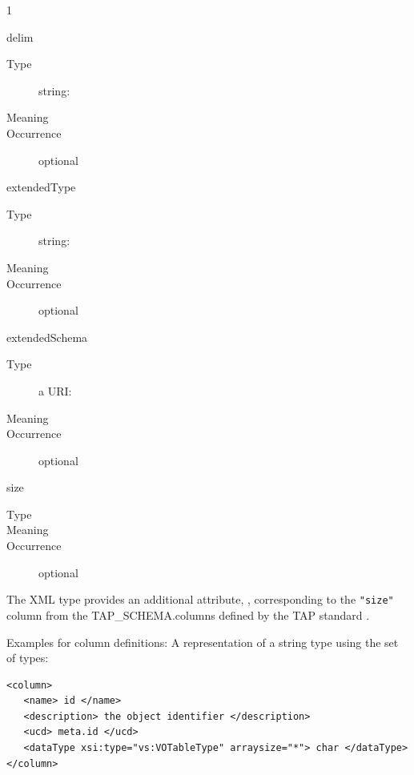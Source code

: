 \documentclass[11pt,a4paper]{ivoa}
\begin{document}
\begin{generated}
\begin{bigdescription}
\begin{description}
1
\end{description}
\item[delim]
\begin{description}
\item[Type] string: 
\item[Meaning] 
\item[Occurrence] optional
 
\end{description}
\item[extendedType]
\begin{description}
\item[Type] string: 
\item[Meaning] 
\item[Occurrence] optional
\end{description}
\item[extendedSchema]
\begin{description}
\item[Type] a URI: 
\item[Meaning] 
\item[Occurrence] optional
\end{description}
\item[size]
\begin{description}
\item[Type] 
\item[Meaning] 
\item[Occurrence] optional
\end{description}


\end{bigdescription}\endgroup

\endgroup
\end{generated}





The  XML type provides an additional attribute,
, corresponding to the \verb|"size"| column from the
TAP\_SCHEMA.columns defined by the TAP standard
\citep{todo:TAP1.1}.




Examples for column definitions:
A representation of a string type using the
 set of types:

\begin{lstlisting}
<column>
   <name> id </name>
   <description> the object identifier </description>
   <ucd> meta.id </ucd>
   <dataType xsi:type="vs:VOTableType" arraysize="*"> char </dataType>
</column>
\end{lstlisting}
\end{document}
